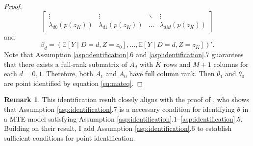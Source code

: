 \documentclass[11pt]{article}
\theoremstyle{definition}
\newtheorem{remark}{Remark}[section]
\newcommand{\Exp}{\ensuremath{\mathbb{E}}} %
\newcommand{\0}{\ensuremath{\mathbf{0}}}
\begin{document}
\begin{bibunit}
\begin{proof}
\[\begin{bmatrix}
		\vdots & \vdots & \ddots & \vdots \\
		\lambda_{d0}(p(z_K)) & \lambda_{d1}(p(z_K)) & \hdots & \lambda_{dM}(p(z_K))
	\end{bmatrix}
	\]
	and 
        \[
            \beta_d = (\Exp[Y\mid D=d, Z=z_0], \ldots, \Exp[Y\mid D=d, Z=z_K])'.
        \]
	Note that Assumption \ref{asp:identification}.6 and \ref{asp:identification}.7 guarantees that there exists a full-rank submatrix of $A_d$ with $\overline{K}$ rows and $M+1$ columns for each $d = 0,1$. Therefore, both $A_1$ and $A_0$ have full column rank. Then $\theta_1$ and $\theta_0$ are point identified by equation \eqref{eq:mateq}.
\end{proof}
\begin{remark}
    This identification result closely aligns with the proof of \citet[Proposition 1.ii]{brinch/mogstad/wiswall:2017}, who shows that Assumption \ref{asp:identification}.7 is a necessary condition for identifying $\theta$ in a MTE model satisfying Assumption \ref{asp:identification}.1--\ref{asp:identification}.5. Building on their result, I add Assumption \ref{asp:identification}.6 to establish sufficient conditions for point identification.
\end{remark}


\end{bibunit}
\end{document}
